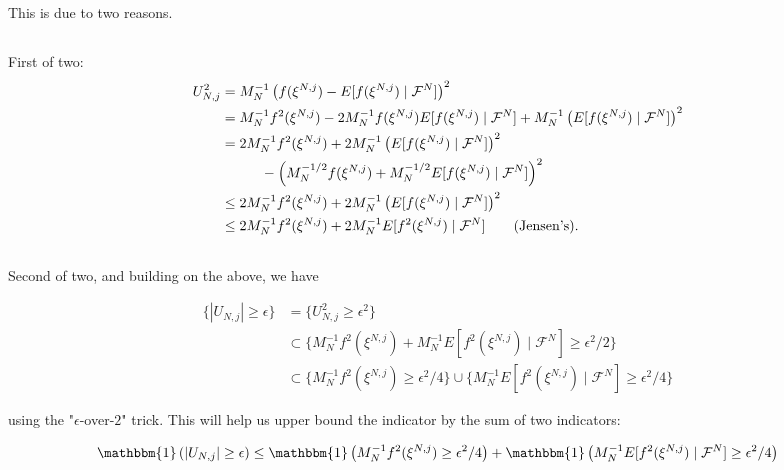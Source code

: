 \documentclass{article}
\begin{document}
This is due to two reasons.

\subsection{}

First of two:
\begin{align*}
U_{N,j}^2 &= M_N^{-1}\left(  f(\xi^{N,j}) - E[f(\xi^{N,j}) \mid \mathcal{F}^N] \right)^2 \\
&= M_N^{-1}f^2(\xi^{N,j}) - 2 M_N^{-1} f(\xi^{N,j}) E[f(\xi^{N,j}) \mid \mathcal{F}^N] + M_N^{-1} \left( E[f(\xi^{N,j}) \mid \mathcal{F}^N] \right)^2 \\
&= 2M_N^{-1}f^2(\xi^{N,j}) + 2M_N^{-1} \left( E[f(\xi^{N,j}) \mid \mathcal{F}^N] \right)^2 \\
&\hspace{10mm}
-\left( M_N^{-1/2}f(\xi^{N,j}) + M_N^{-1/2} E[f(\xi^{N,j}) \mid \mathcal{F}^N] \right)^2 \\
&\le 2M_N^{-1}f^2(\xi^{N,j}) + 2M_N^{-1} \left( E[f(\xi^{N,j}) \mid \mathcal{F}^N] \right)^2  \\
&\le 2M_N^{-1}f^2(\xi^{N,j}) + 2M_N^{-1} E[f^2(\xi^{N,j}) \mid \mathcal{F}^N]  \tag{Jensen's}.
\end{align*}


\subsection{}

Second of two, and building on the above, we have

\begin{align*}
\{|U_{N,j}| \ge \epsilon \} &= \{U_{N,j}^2 \ge \epsilon^2 \} \\
&\subset \{M_N^{-1}f^2(\xi^{N,j}) + M_N^{-1} E[f^2(\xi^{N,j}) \mid \mathcal{F}^N] \ge \epsilon^2/2 \} \\
&\subset \{ M_N^{-1}f^2(\xi^{N,j}) \ge \epsilon^2/4\}  \cup  \{ M_N^{-1} E[f^2(\xi^{N,j}) \mid \mathcal{F}^N] \ge \epsilon^2/4 \}
\end{align*}

using the "$\epsilon$-over-$2$" trick. This will help us upper bound the indicator by the sum of two indicators:

\[
\mathbbm{1} \left( |U_{N,j}| \ge \epsilon \right) \le \mathbbm{1} \left( M_N^{-1}f^2(\xi^{N,j}) \ge \epsilon^2/4 \right) + \mathbbm{1}\left( M_N^{-1} E[f^2(\xi^{N,j}) \mid \mathcal{F}^N] \ge \epsilon^2/4 \right)
\]

\subsection{}
\end{document}
